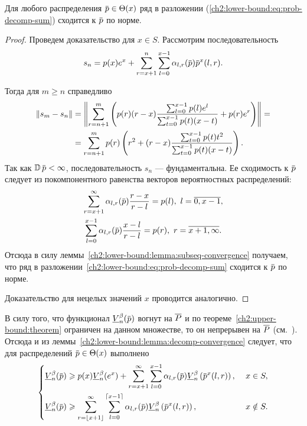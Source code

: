 {\begin{lemma}
  \label{ch2:lower-bound:lemma:decomp-convergence}
  Для любого распределения $\pd \in \Theta(x)$ ряд в разложении (\ref{ch2:lower-bound:eq:prob-decomp-sum}) сходится к $\pd$ по норме.
\end{lemma}
\begin{proof}
  Проведем доказательство для $x \in S$.
  Рассмотрим последовательность
  \begin{equation*}
    s_n = \pc{x} e^x + \sum_{r=x+1}^n \sum_{l=0}^{x-1} \alpha_{l,r}(\pd) \pd^x(l, r).
  \end{equation*}

  Тогда для $m \geqslant n$ справедливо
  \begin{align*}
    \left\lVert s_m-s_n\right\rVert
    &= \left\lVert
      \sum_{r=n+1}^m \left(
      p(r) (r-x) \frac{\sum_{l=0}^{x-1} p(l) e^l}{\sum_{t=0}^{x-1} p(t) (x-t)} + p(r) e^r
      \right)\right\rVert =\\
    &= \sum_{r=n+1}^m p(r) \left(
      r^2 + (r-x) \frac{\sum_{t=0}^{x-1} p(t) t^2}{\sum_{t=0}^{x-1} p(t) (x-t)}
      \right).
  \end{align*}
  Так как $\D \pd < \infty$, последовательность $s_n$ --- фундаментальна.
  Ее сходимость к $\pd$ следует из покомпонентного равенства векторов вероятностных распределений:
  \begin{gather*}
    \sum_{r=x+1}^\infty \alpha_{l,r}(\pd) \frac{r-x}{r-l} = \pc{l},\ l = \overline{0, x-1}, \\
    \sum_{l=0}^{x-1} \alpha_{l,r}(\pd) \frac{x-l}{r-l} = \pc{r},\ r = \overline{x+1, \infty}.
  \end{gather*}
  Отсюда в силу леммы~\ref{ch2:lower-bound:lemma:subseq-convergence} получаем, что ряд в разложении~\eqref{ch2:lower-bound:eq:prob-decomp-sum} сходится к $\pd$ по норме.

  Доказательство для нецелых значений $x$ проводится аналогично.
\end{proof}

В силу того, что функционал $\LowV{n}(\pd)$ вогнут на $\overline{P}$ и по теореме~\ref{ch2:upper-bound:theorem} ограничен на данном множестве, то он непрерывен на $\overline{P}$ (см.~\cite[Теорема 1.7.1]{polovinkin04}).
Отсюда и из леммы~\ref{ch2:lower-bound:lemma:decomp-convergence} следует, что для распределений $\pd \in \Theta(x)$ выполнено
\begin{equation*}
  \left\{
  \begin{aligned}
    \LowV{n}(\pd) &\geqslant
      \pc{x} \LowV{n}(e^x) + \sum_{r=x+1}^\infty \sum_{l=0}^{x-1} \alpha_{l,r}(\pd) \LowV{n} \left( \pd^x(l, r) \right),&\ x \in S,\\
    \LowV{n}(\pd) &\geqslant 
      \sum_{r=\floor{x+1}}^\infty \sum_{l=0}^{\ceil{x-1}} \alpha_{l,r}(\pd) \LowV{n} \left( \pd^x(l, r) \right),&\ x \notin S.
  \end{aligned}
  \right.
\end{equation*}

}
